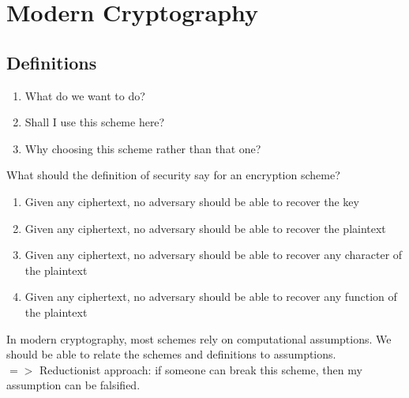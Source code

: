 \documentclass[12pt]{article}   	%
\begin{document}
\section{Modern Cryptography}
\subsection{Definitions}
\begin{enumerate}
\item What do we want to do?
\item Shall I use this scheme here?
\item Why choosing this scheme rather than that one?
\end{enumerate}
\newpage
What should the definition of security say for an encryption scheme?
\begin{enumerate}
\item Given any ciphertext, no adversary should be able to recover the key
\item Given any ciphertext, no adversary should be able to recover the plaintext
\item Given any ciphertext, no adversary should be able to recover any character of the plaintext
\item Given any ciphertext, no adversary should be able to recover any function of the plaintext
\end{enumerate}

In modern cryptography, most schemes rely on computational assumptions. We should be able to relate the schemes and definitions to assumptions. \\
$=>$ Reductionist approach: if someone can break this scheme, then my assumption can be falsified.
\end{document}
